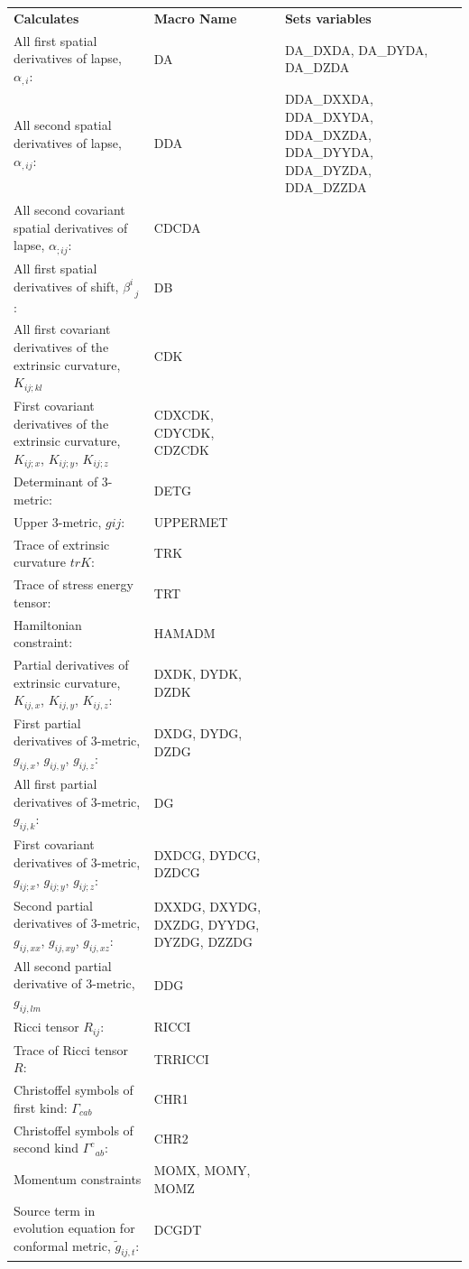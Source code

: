 \begin{tabular}{p{5cm}p{5cm}p{5cm}}
\textbf{Calculates} & \textbf{Macro Name} & \textbf{Sets variables} \\
All first spatial derivatives of lapse, $\alpha_{,i}$: & DA & DA\_DXDA, DA\_DYDA, DA\_DZDA\\
All second spatial derivatives of lapse, $\alpha_{,ij}$: & DDA & DDA\_DXXDA, DDA\_DXYDA, DDA\_DXZDA, DDA\_DYYDA, DDA\_DYZDA, DDA\_DZZDA\\
All second covariant spatial derivatives of lapse, $\alpha_{;ij}$: & CDCDA &\\
All first spatial derivatives of shift, $\beta^{i}_{\;\;j}$: & DB &\\
All first covariant derivatives of the extrinsic curvature, $K_{ij;kl}$ & CDK &\\
First covariant derivatives of the extrinsic curvature, $K_{ij;x}$, $K_{ij;y}$, $K_{ij;z}$ & CDXCDK, CDYCDK, CDZCDK &\\
Determinant of 3-metric: & DETG &\\
Upper 3-metric, $g{ij}$:& UPPERMET &\\
Trace of extrinsic curvature $trK$: & TRK &\\
Trace of stress energy tensor: & TRT &\\
Hamiltonian constraint: & HAMADM & \\
Partial derivatives of extrinsic curvature, $K_{ij,x}$, $K_{ij,y}$, $K_{ij,z}$: & DXDK, DYDK, DZDK &\\
First partial derivatives of 3-metric, $g_{ij,x}$, $g_{ij,y}$, $g_{ij,z}$: & DXDG, DYDG, DZDG & \\
All first partial derivatives of 3-metric, $g_{ij,k}$: & DG &\\
First covariant derivatives of 3-metric, $g_{ij;x}$, $g_{ij;y}$, $g_{ij;z}$: & DXDCG, DYDCG, DZDCG &\\
Second partial derivatives of 3-metric, $g_{ij,xx}$, $g_{ij,xy}$, $g_{ij,xz}$: & DXXDG, DXYDG, DXZDG, DYYDG, DYZDG, DZZDG& \\
All second partial derivative of 3-metric, $g_{ij,lm}$ & DDG &\\
Ricci tensor $R_{ij}$: & RICCI &\\
Trace of Ricci tensor $R$: & TRRICCI &\\
Christoffel symbols of first kind: $\Gamma_{cab}$ & CHR1&\\
Christoffel symbols of second kind $\Gamma^{c}_{\;\;ab}$: & CHR2& \\
Momentum constraints & MOMX, MOMY, MOMZ&\\
Source term in evolution equation for conformal metric, $\tilde{g}_{ij,t}$: & DCGDT &\\

\end{tabular}


